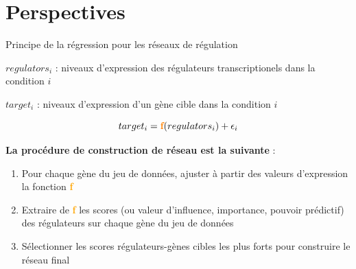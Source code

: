 \section{Perspectives}


\begin{frame}{Principe de la régression pour les réseaux de régulation}
	
	\begin{center}
	\scriptsize 
	$regulators_{i}$ : niveaux d'expression des régulateurs transcriptionels dans la condition $i$
	
	$target_{i}$  : niveaux d'expression d'un gène cible dans la condition $i$
	\end{center}
	\vspace{-0.15cm}
	
	
	\begin{block}{}
	\begin{equation*}
	    target_{i} = \textcolor{orange}{\textbf{f}}(regulators_{i}) + \epsilon_i
	\end{equation*}
	\end{block}
	\vspace{0.25cm}

	\scriptsize 
	
	
	\textbf{La procédure de construction de réseau est la suivante} : 
	
	\begin{enumerate}
	    \item Pour chaque gène du jeu de données, ajuster à partir des valeurs d'expression la fonction \textcolor{orange}{\textbf{f}}
	    \item Extraire de \textcolor{orange}{\textbf{f}} les scores (ou valeur d'influence, importance, pouvoir prédictif) des régulateurs sur chaque gène du jeu de données 
	    \item Sélectionner les scores régulateurs-gènes cibles les plus forts pour construire le réseau final
	\end{enumerate}
\end{frame}




